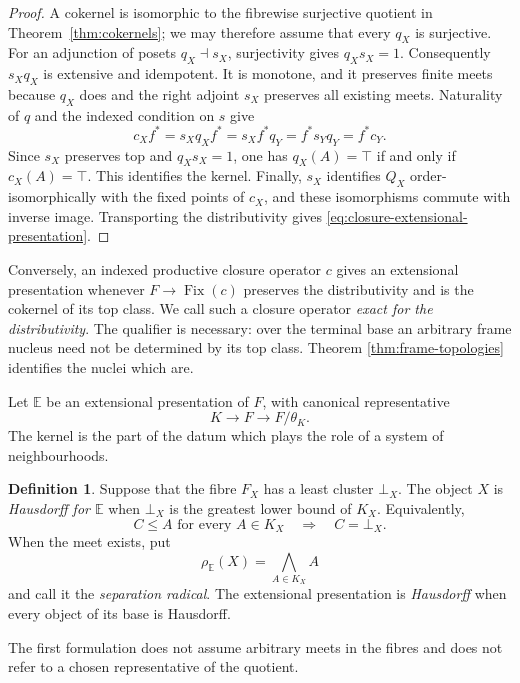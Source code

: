 \documentclass[12pt,oneside,reqno]{amsart}
\theoremstyle{definition}
\newtheorem{definition}[theorem]{Definition}
\theoremstyle{remark}
\begin{document}
\begin{proof}
A cokernel is isomorphic to the fibrewise surjective quotient in
Theorem~\ref{thm:cokernels}; we may therefore assume that every \(q_X\)
is surjective.  For an adjunction of posets \(q_X\dashv s_X\),
surjectivity gives \(q_Xs_X=1\).  Consequently \(s_Xq_X\) is extensive
and idempotent.  It is monotone, and it preserves finite meets because
\(q_X\) does and the right adjoint \(s_X\) preserves all existing meets.
Naturality of \(q\) and the indexed condition on \(s\) give
\[
 c_Xf^*=s_Xq_Xf^*=s_Xf^*q_Y=f^*s_Yq_Y=f^*c_Y.
\]
Since \(s_X\) preserves top and \(q_Xs_X=1\), one has
\(q_X(A)=\top\) if and only if \(c_X(A)=\top\).  This identifies the
kernel.  Finally, \(s_X\) identifies \(Q_X\) order-isomorphically with
the fixed points of \(c_X\), and these isomorphisms commute with inverse
image.  Transporting the distributivity gives
\eqref{eq:closure-extensional-presentation}.
\end{proof}

Conversely, an indexed productive closure operator \(c\) gives an
extensional presentation whenever \(F\to\operatorname{Fix}(c)\)
preserves the distributivity and is the cokernel of its top class.  We
call such a closure operator \emph{exact for the distributivity}.  The
qualifier is necessary: over the terminal base an arbitrary frame
nucleus need not be determined by its top class.  Theorem
\ref{thm:frame-topologies} identifies the nuclei which are.

Let \(\mathbb E\) be an extensional presentation of \(F\), with
canonical representative
\[
                  K\longrightarrow F\longrightarrow F/\theta_K.
\]
The kernel is the part of the datum which plays the role of a system of
neighbourhoods.

\begin{definition}\label{def:hausdorff-object}
Suppose that the fibre \(F_X\) has a least cluster \(\bot_X\).  The
object \(X\) is \emph{Hausdorff for \(\mathbb E\)} when \(\bot_X\) is
the greatest lower bound of \(K_X\).  Equivalently,
\[
 C\leqslant A\text{ for every }A\in K_X
 \quad\Longrightarrow\quad C=\bot_X.
\]
When the meet exists, put
\[
                  \rho_{\mathbb E}(X)=\bigwedge_{A\in K_X}A
\]
and call it the \emph{separation radical}.  The extensional presentation
is \emph{Hausdorff} when every object of its base is Hausdorff.
\end{definition}

The first formulation does not assume arbitrary meets in the fibres and
does not refer to a chosen representative of the quotient.
\end{document}
